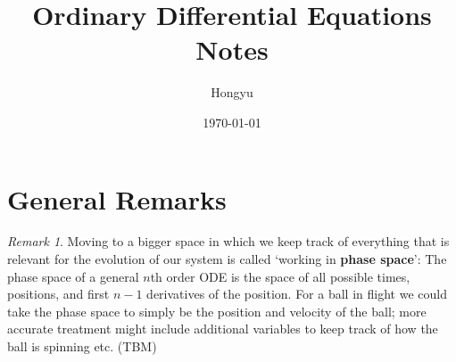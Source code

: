 \documentclass{article}
\title{Ordinary Differential Equations Notes}
\author{Hongyu}
\date{\today}
\theoremstyle{remark}
\newtheorem{remark}[theorem]{Remark}
\theoremstyle{definition}
\begin{document}
\section{General Remarks}    
    
\begin{remark}
    Moving to a bigger space in which we keep track of everything that is relevant for the evolution of our system is called ‘working in \textbf{phase space}’: The phase space of a general $n$th order ODE is the space of all possible times, positions, and ﬁrst $n - 1$ derivatives of the position. For a ball in ﬂight we could take the phase space to simply be the position and velocity of the ball; more accurate treatment might include additional variables to keep track of how the ball is spinning etc. (TBM)
\end{remark}
    
\end{document}
